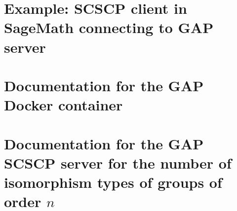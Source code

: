 \documentclass{deliverablereport}
\begin{document}
\section{Example: SCSCP client in SageMath connecting to GAP server}\label{SageMath-to-GAP}


\section{Documentation for the GAP Docker container}\label{SCSCP-with-GAP-docker}


\section{Documentation for the GAP SCSCP server for the number of isomorphism types of groups of order $n$}\label{Gnu-SCSCP-server}


%
%
\end{document}
